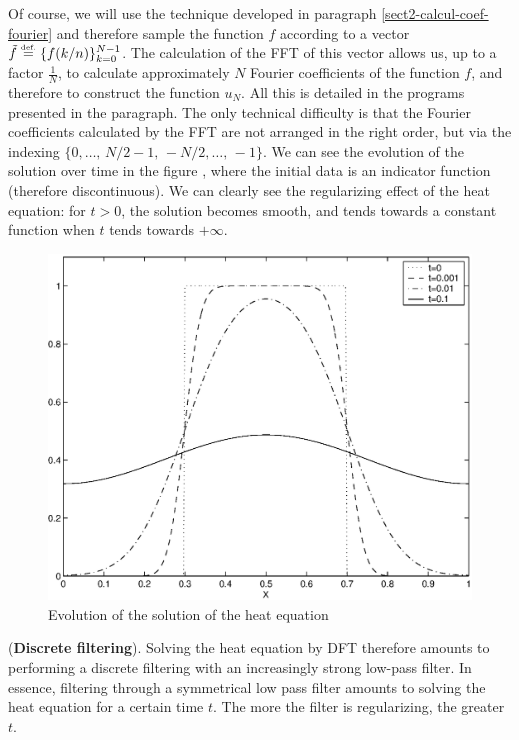  Of course, we will use the technique developed in paragraph \ref{sect2-calcul-coef-fourier} and therefore sample the function $ f $ according to a vector $ \tilde{f} \stackrel{\mbox{\upshape\tiny def.}}{=} \{f(k / n) \}_{k = 0}^{N-1} $. The calculation of the FFT of this vector allows us, up to a factor $ \frac{1}{N} $, to calculate approximately $ N $ Fourier coefficients of the function $ f $, and therefore to construct the function $ u_N $. All this is detailed in the \Matlab{} programs presented in the  paragraph. The only technical difficulty is that the Fourier coefficients calculated by the FFT are not arranged in the right order, but via the indexing $ \{0, \ldots, \, N / 2-1, \, -N / 2 , \ldots, \, -1 \} $. We can see the evolution of the solution over time in the figure , where the initial data is an indicator function (therefore discontinuous). We can clearly see the regularizing effect of the heat equation: for $ t> 0 $, the solution becomes smooth, and tends towards a constant function when $ t $ tends towards $ + \infty $. \begin{figure}[ht]
    \begin{center}
    \includegraphics[scale=0.4]{images/eq-chaleur-evolution.eps}
    \end{center}
    \caption{Evolution of the solution of the heat equation}
              \label{fig-eq-heat-evolution}
\end{figure}
 
 
\begin{rem}{(\upshape \textbf{Discrete filtering}).} 
 Solving the heat equation by DFT therefore amounts to performing a discrete filtering with an increasingly strong low-pass filter. In essence, filtering through a symmetrical low pass filter amounts to solving the heat equation for a certain time $ t $. The more the filter is regularizing, the greater $ t $.
\end{rem}
 
